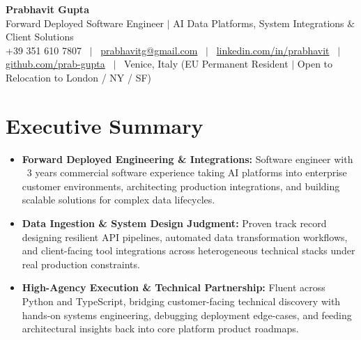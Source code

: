 \documentclass[a4paper,10pt]{article}
\begin{document}
\begin{minipage}[c]{0.80\textwidth}
  {\Huge\bfseries Prabhavit Gupta}\\[3pt]
  {\color{accent}\large Forward Deployed Software Engineer $\vert$ AI Data Platforms, System Integrations $\&$ Client Solutions}\\[6pt]
  {\footnotesize +39 351 610 7807 ~$\vert$~
  \href{mailto:prabhavitg@gmail.com}{prabhavitg@gmail.com} ~$\vert$~
  \href{https://www.linkedin.com/in/prabhavit/}{linkedin.com/in/prabhavit} ~$\vert$~
  \href{https://github.com/prab-gupta}{github.com/prab-gupta} ~$\vert$~
  Venice, Italy (EU Permanent Resident $\vert$ Open to Relocation to London / NY / SF)}
\end{minipage}\hfill

\vspace{6pt}

\section{Executive Summary}
\begin{itemize}
  \item \textbf{Forward Deployed Engineering \& Integrations:} Software engineer with ~3 years commercial software experience taking AI platforms into enterprise customer environments, architecting production integrations, and building scalable solutions for complex data lifecycles.
  \item \textbf{Data Ingestion \& System Design Judgment:} Proven track record designing resilient API pipelines, automated data transformation workflows, and client-facing tool integrations across heterogeneous technical stacks under real production constraints.
  \item \textbf{High-Agency Execution \& Technical Partnership:} Fluent across Python and TypeScript, bridging customer-facing technical discovery with hands-on systems engineering, debugging deployment edge-cases, and feeding architectural insights back into core platform product roadmaps.
\end{itemize}

\end{document}
